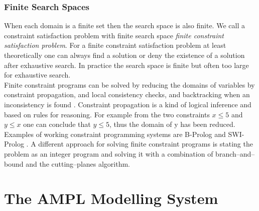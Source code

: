 \subsubsection{Finite Search Spaces}
When each domain is a finite set then the search space is also finite. We call a constraint satisfaction problem with finite search space \emph{finite constraint satisfaction problem}. For a finite constraint satisfaction problem at least theoretically one can always find a solution or deny the existence of a solution after exhaustive search. In practice the search space is finite but often too large for exhaustive search.\\
Finite constraint programs can be solved by reducing the domains of variables by constraint propagation, and local consistency checks, and backtracking when an inconsistency is found \cite{ConstraintPropagation}. Constraint propagation is a kind of logical inference and based on rules for reasoning. For example from the two constraints $x\leq 5$ and $y \leq x$ one can conclude that $y\leq 5$, thus the domain of y has been reduced. Examples of working constraint programming systems are B-Prolog and SWI-Prolog \cite{citation needed}. %
A different approach for solving finite constraint programs is stating the problem as an integer program and solving it with a combination of branch--and--bound and the cutting--planes algorithm.

\section{The AMPL Modelling System}
\label{sec:AMPL}
\cite{AMPL}
